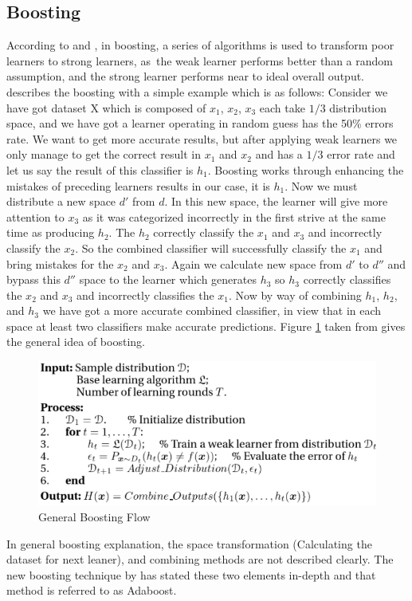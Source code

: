 \documentclass[12pt]{article}
\begin{document}
\subsection{Boosting}
According to \citep{freund1996experiments} and \citep{zhou2012ensemble}, in boosting, a series of algorithms is used to transform poor learners to strong learners, as the weak learner performs better than a random assumption, and the strong learner performs near to ideal overall output. \citep{zhou2012ensemble} describes the boosting with a simple example which is as follows: Consider we have got dataset X which is composed of $x_1$, $x_2$, $x_3$ each take $1/3$ distribution space, and we have got a learner operating in random guess has the 50\% errors rate. We want to get more accurate results, but after applying weak learners we only manage to get the correct result in $x_1$ and $x_2$ and has a $1/3$ error rate and let us say the result of this classifier is $h_1$. Boosting works through enhancing the mistakes of preceding learners results in our case, it is $h_1$. Now we must distribute a new space $d'$ from $d$. In this new space, the learner will give more attention to $x_3$ as it was categorized incorrectly in the first strive at the same time as producing $h_2$. The $h_2$ correctly classify the $x_1$ and $x_3$ and incorrectly classify the $x_2$. So the combined classifier will successfully classify the $x_1$ and bring mistakes for the $x_2$ and $x_3$. Again we calculate new space from $d'$ to $d''$ and bypass this $d''$ space to the learner which generates $h_3$ so $h_3$ correctly classifies the $x_2$ and $x_3$ and incorrectly classifies the $x_1$. Now by way of combining $h_1$, $h_2$, and $h_3$ we have got a more accurate combined classifier, in view that in each space at least two classifiers make accurate predictions. Figure \ref{fig:GeneralBoosting} taken from \citep{zhou2012ensemble} gives the general idea of boosting. 
               \begin{figure}[h!]
               	\centering
               	\includegraphics{GeneralBoosting.png}
               	\caption{General Boosting Flow ~\citep{zhou2012ensemble}}
               	\label{fig:GeneralBoosting}
               \end{figure}
               In general boosting explanation, the space transformation (Calculating the dataset for next leaner), and combining methods are not described clearly. The new boosting technique by \citep{freund1996experiments} has stated these two elements in-depth and that method is referred to as Adaboost.
               
\end{document}

